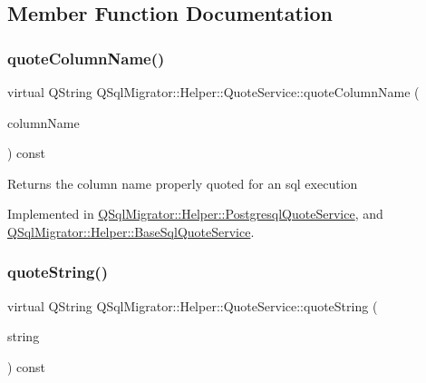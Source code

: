 \subsection{Member Function Documentation}
\mbox{\label{class_q_sql_migrator_1_1_helper_1_1_quote_service_ae5ed3750bb00609d483996e7baa6f885}} 
\subsubsection{\texorpdfstring{quote\+Column\+Name()}{quoteColumnName()}}
{\footnotesize\ttfamily virtual Q\+String Q\+Sql\+Migrator\+::\+Helper\+::\+Quote\+Service\+::quote\+Column\+Name (\begin{DoxyParamCaption}\item[{const Q\+String \&}]{column\+Name }\end{DoxyParamCaption}) const\hspace{0.3cm}{\ttfamily [pure virtual]}}

\begin{DoxyReturn}{Returns}
the column name properly quoted for an sql execution 
\end{DoxyReturn}


Implemented in \hyperlink{class_q_sql_migrator_1_1_helper_1_1_postgresql_quote_service_af54cb8f1749e470e2ea8794fb58896c8}{Q\+Sql\+Migrator\+::\+Helper\+::\+Postgresql\+Quote\+Service}, and \hyperlink{class_q_sql_migrator_1_1_helper_1_1_base_sql_quote_service_a26aebafe6d736520b5661c82a4db4ae9}{Q\+Sql\+Migrator\+::\+Helper\+::\+Base\+Sql\+Quote\+Service}.

\mbox{\label{class_q_sql_migrator_1_1_helper_1_1_quote_service_a5a557ef5b418afcbe9ae01ce57616218}} 
\subsubsection{\texorpdfstring{quote\+String()}{quoteString()}}
{\footnotesize\ttfamily virtual Q\+String Q\+Sql\+Migrator\+::\+Helper\+::\+Quote\+Service\+::quote\+String (\begin{DoxyParamCaption}\item[{const Q\+String \&}]{string }\end{DoxyParamCaption}) const\hspace{0.3cm}{\ttfamily [pure virtual]}}

